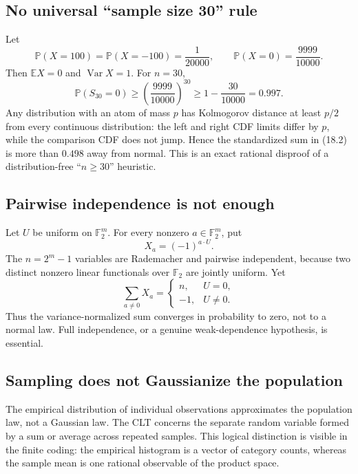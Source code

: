 \documentclass[11pt]{article}
\newcommand{\E}{\mathbb E}
\newcommand{\Pp}{\mathbb P}
\newcommand{\Var}{\operatorname{Var}}
\begin{document}
\subsection{No universal ``sample size 30'' rule}

Let
\[
 \Pp(X=100)=\Pp(X=-100)=\frac1{20000},
 \qquad \Pp(X=0)=\frac{9999}{10000}.                  \tag{18.1}
\]
Then \(\E X=0\) and \(\Var X=1\).  For \(n=30\),
\[
 \Pp(S_{30}=0)\ge\left(\frac{9999}{10000}\right)^{30}
 \ge1-\frac{30}{10000}=0.997.                        \tag{18.2}
\]
Any distribution with an atom of mass \(p\) has Kolmogorov distance at least
\(p/2\) from every continuous distribution: the left and right CDF limits
differ by \(p\), while the comparison CDF does not jump.  Hence the
standardized sum in (18.2) is more than \(0.498\) away from normal.  This is
an exact rational disproof of a distribution-free ``\(n\ge30\)'' heuristic.

\subsection{Pairwise independence is not enough}

Let \(U\) be uniform on \(\mathbb F_2^m\).  For every nonzero
\(a\in\mathbb F_2^m\), put
\[
 X_a=(-1)^{a\cdot U}.                                 \tag{18.3}
\]
The \(n=2^m-1\) variables are Rademacher and pairwise independent, because
two distinct nonzero linear functionals over \(\mathbb F_2\) are jointly
uniform.  Yet
\[
 \sum_{a\ne0}X_a=
 \begin{cases}
 n,&U=0,\\
 -1,&U\ne0.
 \end{cases}                                          \tag{18.4}
\]
Thus the variance-normalized sum converges in probability to zero, not to a
normal law.  Full independence, or a genuine weak-dependence hypothesis, is
essential.

\subsection{Sampling does not Gaussianize the population}

The empirical distribution of individual observations approximates the
population law, not a Gaussian law.  The CLT concerns the separate random
variable formed by a sum or average across repeated samples.  This logical
distinction is visible in the finite coding: the empirical histogram is a
vector of category counts, whereas the sample mean is one rational observable
of the product space.
\end{document}
